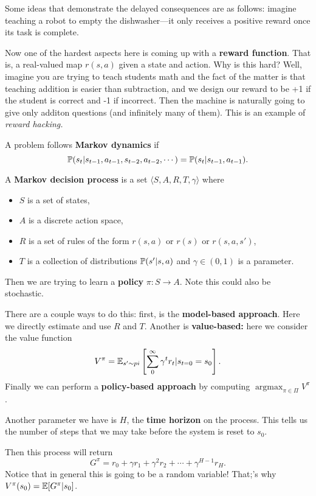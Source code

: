 \documentclass[12pt]{article}
\DeclareMathOperator*{\argmax}{argmax}
\begin{document}
Some ideas that demonstrate the delayed consequences are as follows: imagine teaching a robot to empty the dishwasher---it only receives a positive reward once its task is complete. 

Now one of the hardest aspects here is coming up with a \textbf{reward function}. That is, a real-valued map $r(s,a)$ given a state and action. Why is this hard?
Well, imagine you are trying to teach students math and the fact of the matter is that teaching addition is easier than subtraction, and we design our reward to be +1 if the student is correct and -1 if incorrect.
Then the machine is naturally going to give only additon questions (and infinitely many of them). This is an example of \textit{reward hacking.}

A problem follows \textbf{Markov dynamics} if 
\[\mathbb{P}(s_t|s_{t-1},a_{t-1},s_{t-2},a_{t-2},\cdots)=\mathbb{P}(s_t|s_{t-1},a_{t-1}).\]
\begin{defn}
	A \textbf{Markov decision process} is a set $\langle S,A,R,T,\gamma\rangle$ where 
	\begin{itemize}
		\item $S$ is a set of states,
		\item $A$ is a discrete action space,
		\item $R$ is a set of rules of the form $r(s,a)$ or $r(s)$ or $r(s,a,s')$,
		\item $T$ is a collection of distributions $\mathbb{P}(s'|s,a)$ and $\gamma\in(0,1)$ is a parameter.
	\end{itemize}

	Then we are trying to learn a \textbf{policy} $\pi:S\to A$. Note this could also be stochastic.
\end{defn}

There are a couple ways to do this: first, is the \textbf{model-based approach}. Here we directly estimate and use $R$ and $T$. Another is \textbf{value-based:}
here we consider the value function 
\[V^\pi=\mathbb{E}_{s'\sim pi}\left[\sum_0^\infty\gamma^tr_t|s_{t=0}=s_0\right].\]
Finally we can perform a \textbf{policy-based approach} by computing $\argmax_{\pi\in\Pi}V^\pi$.

Another parameter we have is $H$, the \textbf{time horizon} on the process. This tells us the number of steps that we may take before the system is reset to $s_0$.

Then this process will return
\[G^\pi=r_{0}+\gamma r_{1}+\gamma^2r_2+\cdots+\gamma^{H-1}r_H.\]
Notice that in general this is going to be a random variable! That;'s why $V^\pi(s_0)=\mathbb{E}[G^\pi|s_0]$.
\end{document}
